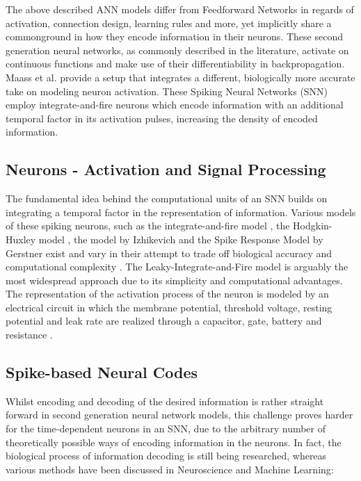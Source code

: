 \documentclass[letterpaper, 10 pt, conference]{ieeeconf}  %
\begin{document}
The above described ANN models differ from Feedforward Networks in regards of activation, connection design, learning rules and more, yet implicitly
share a commonground in how they encode information in their neurons. These second generation neural networks, as commonly described in the literature,
activate on continuous functions and make use of their differentiability in backpropagation. Maass et al. \cite{maassNetworksSpikingNeurons1997} 
provide a setup that
integrates a different, biologically more accurate take on modeling neuron activation. These Spiking Neural Networks (SNN) employ
integrate-and-fire neurons \cite{maassNetworksSpikingNeurons} which encode information with an additional temporal factor in its activation pulses, increasing
the density of encoded information.  

\subsection{Neurons - Activation and Signal Processing} 

The fundamental idea behind the computational units of an SNN builds on integrating a temporal factor 
in the representation of information. Various models of these spiking neurons, such as the integrate-and-fire model
 \cite{abbottLapicqueIntroductionIntegrateandfire1999}, 
the Hodgkin-Huxley model \cite{hodgkinQuantitativeDescriptionMembrane1952}, the model by Izhikevich \cite{izhikevichSimpleModelSpiking2003}
and the Spike Response Model by Gerstner \cite{gerstnerSpikeresponseModel2008}
exist and vary in their attempt to trade off biological accuracy and computational complexity \cite{gruningSpikingNeuralNetworks2014}.
The Leaky-Integrate-and-Fire model is arguably the most widespread approach due to its simplicity and computational advantages. 
The representation of the activation process of the neuron is modeled by an electrical circuit in which the membrane potential, threshold voltage,
resting potential and leak rate are realized through a capacitor, gate, battery and resistance
\cite{abbottLapicqueIntroductionIntegrateandfire1999}\cite{ponulakIntroductionSpikingNeural2011}.
\subsection{Spike-based Neural Codes}

Whilst encoding and decoding of the desired information is rather straight forward in second generation neural network models,
this challenge proves harder for the time-dependent neurons in an SNN, due to the arbitrary 
number of theoretically possible ways of encoding information in the neurons. In fact, the biological process of information decoding is 
still being researched, whereas various methods have been discussed in Neuroscience and Machine Learning:
\end{document}
